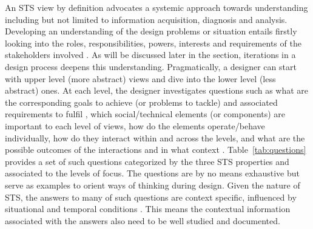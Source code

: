 An STS view by definition advocates a systemic approach towards understanding including but not limited to information acquisition, diagnosis and analysis. Developing an understanding of the design problems or situation entails firstly looking into the roles, responsibilities, powers, interests and requirements of the stakeholders involved \cite{Checkland1981}. As will be discussed later in the section, iterations in a design process deepens this understanding. 
Pragmatically, a designer can start with upper level (more abstract) views and dive into the lower level (less abstract) ones. %
At each level, the designer investigates questions such as what are the corresponding goals to achieve (or problems to tackle) \cite{Checkland1981,Waterson2002} and associated requirements to fulfil \cite{Whitworth2009a}, which social/technical elements (or components) are important to each level of views, how do the elements operate/behave individually, how do they interact within and across the levels, and what are the possible outcomes of the interactions and in what context \cite{Baxter2011}. 
%
Table~\ref{tab:questions} provides a set of such questions categorized by the three STS properties and associated to the levels of focus. The questions are by no means exhaustive but serve as examples to orient ways of thinking during design. 
Given the nature of STS, the answers to many of such questions are context specific, influenced by situational and temporal conditions \cite{Baxter2011,Norman2015}. This means the contextual information associated with the answers also need to be well studied and documented. 
% 
